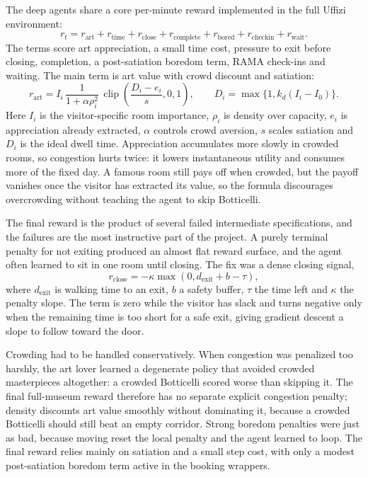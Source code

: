 \documentclass[11pt]{article}
\numberwithin{equation}{section} %
\begin{document}
The deep agents share a core per-minute reward implemented in the full Uffizi environment:
\begin{equation}
r_t =
r_{\text{art}}+r_{\text{time}}+r_{\text{close}}+r_{\text{complete}}
+r_{\text{bored}}+r_{\text{checkin}}+r_{\text{wait}}.
\label{eq:reward}
\end{equation}
The terms score art appreciation, a small time cost, pressure to exit before closing, completion, a
post-satiation boredom term, RAMA check-ins and waiting. The main term is art value with crowd discount and
satiation:
\begin{equation}
r_{\text{art}} =
I_i\,\frac{1}{1+\alpha \rho_i^2}\,
\operatorname{clip}\!\left(\frac{D_i-e_i}{s},0,1\right),
\qquad
D_i=\max\{1,k_d(I_i-I_0)\}.
\label{eq:art}
\end{equation}
Here $I_i$ is the visitor-specific room importance, $\rho_i$ is density over capacity, $e_i$ is appreciation
already extracted, $\alpha$ controls crowd aversion, $s$ scales satiation and $D_i$ is the ideal dwell time.
Appreciation accumulates more slowly in crowded rooms, so congestion hurts twice: it lowers instantaneous
utility and consumes more of the fixed day. A famous room still pays off when crowded, but the payoff vanishes
once the visitor has extracted its value, so the formula discourages overcrowding without teaching the agent
to skip Botticelli.

The final reward is the product of several failed intermediate specifications, and the failures are the most
instructive part of the project. A purely terminal penalty for not exiting produced an almost flat reward
surface, and the agent often learned to sit in one room until closing. The fix was a dense closing signal,
\begin{equation}
r_{\text{close}}=-\kappa\max(0,d_{\text{exit}}+b-\tau),
\label{eq:close}
\end{equation}
where $d_{\text{exit}}$ is walking time to an exit, $b$ a safety buffer, $\tau$ the time left and $\kappa$ the
penalty slope. The term is zero while the visitor has slack and turns negative only when the remaining time is
too short for a safe exit, giving gradient descent a slope to follow toward the door.

Crowding had to be handled conservatively. When congestion was penalized too harshly, the art lover learned a
degenerate policy that avoided crowded masterpieces altogether: a crowded Botticelli scored worse than
skipping it. The final full-museum reward therefore has no separate explicit congestion penalty; density
discounts art value smoothly without dominating it, because a crowded Botticelli should still beat an empty
corridor. Strong boredom penalties were just as bad, because moving reset the local penalty and the agent
learned to loop. The final reward relies mainly on satiation and a small step cost, with only a modest
post-satiation boredom term active in the booking wrappers.
\end{document}
